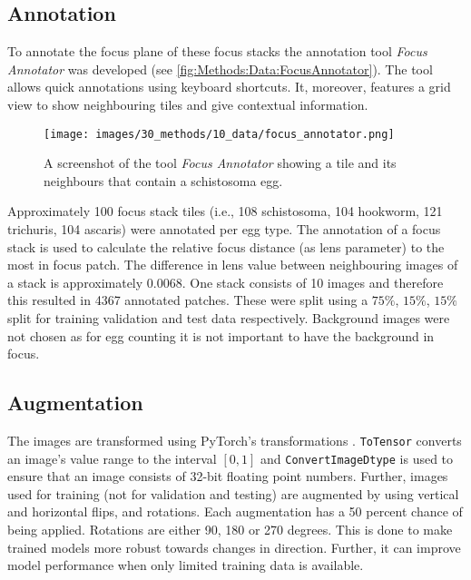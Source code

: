 \subsection{Annotation}
\label{sec:Methods:Data:Annotation}

To annotate the focus plane of these focus stacks the annotation tool \emph{Focus Annotator} \cite{kuchelmeister2022focus} was developed (see \autoref{fig:Methods:Data:FocusAnnotator}). The tool allows quick annotations using keyboard shortcuts. It, moreover, features a grid view to show neighbouring tiles and give contextual information.

\begin{figure}
    \centering
    \texttt{[image: images/30\_methods/10\_data/focus\_annotator.png]}
    \caption{A screenshot of the tool \emph{Focus Annotator} showing a tile and its neighbours that contain a schistosoma egg.}
    \label{fig:Methods:Data:FocusAnnotator}
\end{figure}


Approximately 100 focus stack tiles (i.e., 108 schistosoma, 104 hookworm, 121 trichuris, 104 ascaris) were annotated per egg type. The annotation of a focus stack is used to calculate the relative focus distance (as lens parameter) to the most in focus patch. The difference in lens value between neighbouring images of a stack is approximately $0.0068$.  One stack consists of 10 images and therefore this resulted in 4367 annotated patches. These were split using a $75\%$, $15\%$, $15\%$ split for training validation and test data respectively. Background images were not chosen as for egg counting it is not important to have the background in focus.

\subsection{Augmentation}
\label{sec:Methods:Data:Augmentation}

The images are transformed using PyTorch's transformations \cite{paszke2019pytorch, 2021pytorch}. \texttt{ToTensor} converts an image's value range to the interval $[0, 1]$ and \texttt{ConvertImageDtype} is used to ensure that an image consists of 32-bit floating point numbers. Further, images used for training (not for validation and testing) are augmented by using vertical and horizontal flips, and rotations. Each augmentation has a 50 percent chance of being applied. Rotations are either 90, 180 or 270 degrees.
This is done to make trained models more robust towards changes in direction. Further, it can improve model performance when only limited training data is available. 


